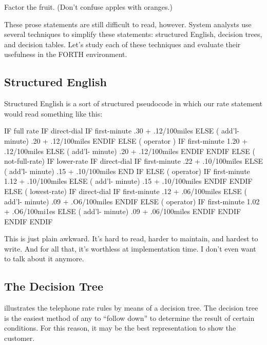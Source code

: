 \begin{tip}
Factor the fruit. (Don't confuse apples with oranges.)
\end{tip}

\noindent These prose statements are still difficult to read, however. System
analysts use several techniques to simplify these statements: structured
English, decision trees, and decision tables. Let's study each of these
techniques and evaluate their usefulness in the FORTH environment.

\subsection{Structured English}

\noindent Structured English is a sort of structured pseudocode in which our rate
statement would read something like this:

\begin{Code}[commentchar=\%]
IF full rate
   IF direct-dial
      IF first-minute
	 .30 + .12/100miles
      ELSE ( add'l- minute)
	 .20 + .12/100miles
      ENDIF
   ELSE ( operator )
      IF first-minute
	 1.20 + .12/100miles
      ELSE ( add'l- minute)
	 .20 + .12/100miles
      ENDIF
   ENDIF
ELSE ( not-full-rate)
   IF lower-rate
      IF direct-dial
	 IF first-minute
	    .22 + .10/100miles
	 ELSE ( add'l- minute)
	    .15 + .10/100miles
	 END IF
      ELSE ( operator)
	 IF first-minute
	    1.12 + .10/100miles
	 ELSE ( add'l- minute)
	    .15 + .10/100miles
	 ENDIF
      ENDIF
   ELSE ( lowest-rate)
      IF direct-dial
	 IF first-minute
	    .12 + .06/100miles
	 ELSE ( add'l- minute)
	    .09 + .O6/100miles
	 ENDIF
      ELSE ( operator)
	 IF first-minute
	    1.02 + .O6/100mi1es
	 ELSE ( add'l- minute)
	    .09 + .06/100miles
	 ENDIF
      ENDIF
   ENDIF
ENDIF
\end{Code}

\noindent This is just plain awkward. It's hard to read, harder to maintain, and
hardest to write. And for all that, it's worthless at implementation time.
I don't even want to talk about it anymore.

\subsection{The Decision Tree}

\noindent {} illustrates the telephone rate rules by means of a decision tree.
The decision tree is the easiest method of any to ``follow down'' to
determine the result of certain conditions. For this reason, it may be the best
representation to show the customer.

